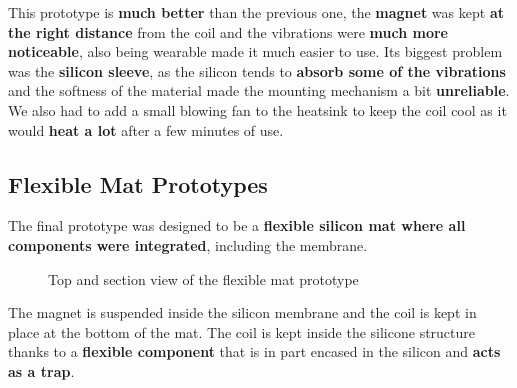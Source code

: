 This prototype is \textbf{much better} than the previous one, the \textbf{magnet} was kept \textbf{at the right distance} from the coil and the vibrations were \textbf{much more noticeable}, also being wearable made it much easier to use.
Its biggest problem was the \textbf{silicon sleeve}, as the silicon tends to \textbf{absorb some of the vibrations} and the softness of the material made the mounting mechanism a bit \textbf{unreliable}.  
We also had to add a small blowing fan to the heatsink to keep the coil cool as it would \textbf{heat a lot} after a few minutes of use.

\subsection{Flexible Mat Prototypes}
The final prototype was designed to be a \textbf{flexible silicon mat where all components were integrated}, including the membrane.

\newsavebox{\largestimage}
\begin{figure}[H]
    \centering
    \begin{subcaptiongroup}
        \centering
        \parbox[b]{0.2\textwidth}{
            \centering
            \usebox{
                \largestimage
            }
        }
        \parbox[b]{0.2\textwidth}{
            \centering
        }
    \end{subcaptiongroup}
    \caption{Top and section view of the flexible mat prototype}
\end{figure}
The magnet is suspended inside the silicon membrane and the coil is kept in place at the bottom of the mat.
The coil is kept inside the silicone structure thanks to a \textbf{flexible component} that is in part encased in the silicon and \textbf{acts as a trap}.

